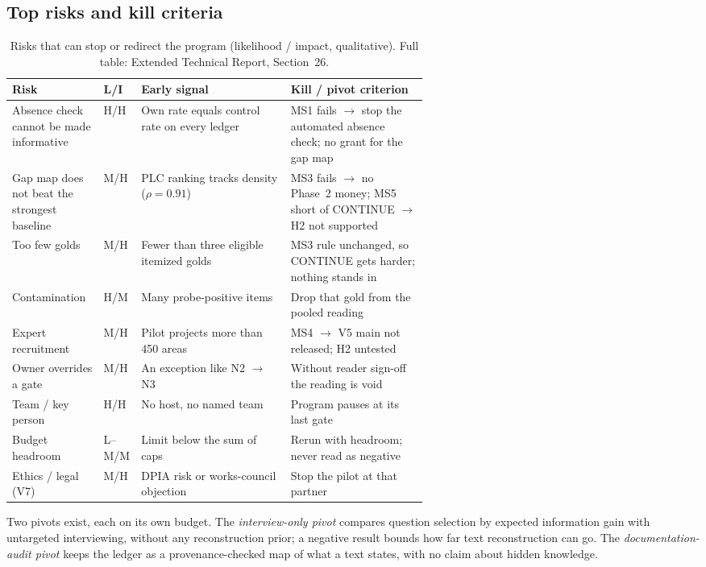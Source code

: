 \subsection{Top risks and kill criteria}

\begin{table}[htbp]
  \centering\footnotesize
  \caption{Risks that can stop or redirect the program (likelihood / impact, qualitative). Full table:
    Extended Technical Report, Section~26.}
  \label{tab:risks}
  \begin{tabularx}{\linewidth}{@{}>{\raggedright\arraybackslash}p{0.22\linewidth}
      >{\raggedright\arraybackslash}p{0.05\linewidth}>{\raggedright\arraybackslash}X
      >{\raggedright\arraybackslash}p{0.33\linewidth}@{}}
    \toprule
    Risk & L/I & Early signal & Kill / pivot criterion \\
    \midrule
    Absence check cannot be made informative & H/H & \evobs{} Own rate equals control rate on every
      ledger & MS1 fails $\to$ stop the automated absence check; no grant for the gap map \\
    Gap map does not beat the strongest baseline & M/H & PLC ranking tracks density ($\rho = 0.91$) &
      MS3 fails $\to$ no Phase~2 money; MS5 short of CONTINUE $\to$ H2 not supported \\
    Too few golds & M/H & Fewer than three eligible itemized golds & MS3 rule unchanged, so CONTINUE
      gets harder; nothing stands in \\
    Contamination & H/M & Many probe-positive items & Drop that gold from the pooled reading \\
    Expert recruitment & M/H & Pilot projects more than 450 areas & MS4 $\to$ V5 main not released; H2
      untested \\
    Owner overrides a gate & M/H & An exception like N2 $\to$ N3 & Without reader sign-off the reading is
      void \\
    Team / key person & H/H & No host, no named team & Program pauses at its last gate \\
    Budget headroom & L--M/M & Limit below the sum of caps & Rerun with headroom; never read as
      negative \\
    Ethics / legal (V7) & M/H & DPIA risk or works-council objection & Stop the pilot at that partner \\
    \bottomrule
  \end{tabularx}
\end{table}

\evint{} Two pivots exist, each on its own budget. The \emph{interview-only pivot} compares question
selection by expected information gain with untargeted interviewing, without any reconstruction prior; a
negative result bounds how far text reconstruction can go. The \emph{documentation-audit pivot} keeps the
ledger as a provenance-checked map of what a text states, with no claim about hidden knowledge.

